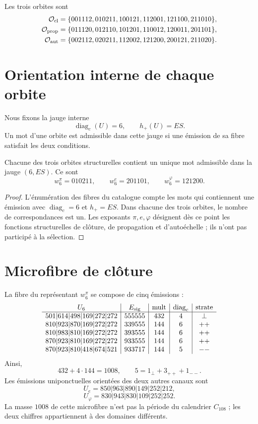 Les trois orbites sont
\begin{align*}
\mathcal O_{\rm cl}
 &=\{001112,010211,100121,112001,121100,211010\},\\
\mathcal O_{\rm prop}
 &=\{011120,012110,101201,110012,120011,201101\},\\
\mathcal O_{\rm aut}
 &=\{002112,020211,112002,121200,200121,211020\}.
\end{align*}

\section{Orientation interne de chaque orbite}

Nous fixons la jauge interne
\[
 \operatorname{diag}_c(U)=6,
 \qquad h_+(U)=ES.
\]
Un mot d'une orbite est admissible dans cette jauge si une émission de
sa fibre satisfait les deux conditions.

\begin{proposition}
\label{prop:representante-orientado-unico}
Chacune des trois orbites structurelles contient un unique mot
admissible dans la jauge \((6,ES)\). Ce sont
\[
 \boxed{
 w_6^\pi=010211,
 \qquad
 w_6^e=201101,
 \qquad
 w_6^\varphi=121200.}
\]
\end{proposition}

\begin{proof}
L'énumération des fibres du catalogue compte les mots qui contiennent
une émission avec \(\operatorname{diag}_c=6\) et \(h_+=ES\). Dans chacune des
trois orbites, le nombre de correspondances est un. Les exposants
\(\pi,e,\varphi\) désignent dès ce point les fonctions structurelles de
clôture, de propagation et d'autoéchelle ; ils n'ont pas participé à la sélection.
\end{proof}

\section{Microfibre de clôture}

La fibre du représentant \(w_6^\pi\) se compose de cinq émissions :
\[
\begin{array}{c|c|c|c|c}
U_6&E_{\rm sig}&\operatorname{mult}&\operatorname{diag}_c&\text{strate}\\\hline
501|614|498|169|272|272&555555&432&4&\perp\\
810|923|870|169|272|272&339555&144&6&++\\
810|983|810|169|272|272&393555&144&6&++\\
870|923|810|169|272|272&933555&144&6&++\\
870|923|810|418|674|521&933717&144&5&--
\end{array}
\]
Ainsi,
\[
 432+4\cdot144=1008,
 \qquad
 5=1_\perp+3_{++}+1_{--}.
\]
Les émissions uniponctuelles orientées des deux autres canaux sont
\[
 U_e=850|963|890|149|252|212,
\]
\[
 U_\varphi=830|943|830|109|252|252.
\]
La masse \(1008\) de cette microfibre n'est pas la période du calendrier
\(C_{108}\) ; les deux chiffres appartiennent à des domaines différents.

